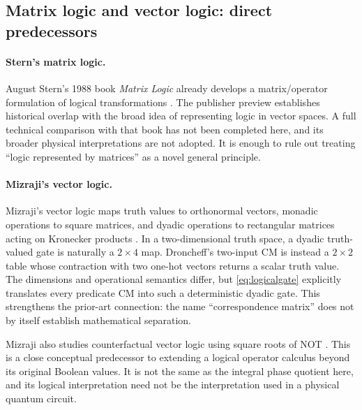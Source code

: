 \subsection{Matrix logic and vector logic: direct predecessors}
\paragraph{Stern's matrix logic.}
August Stern's 1988 book \emph{Matrix Logic} already develops a matrix/operator formulation of logical transformations \cite{stern1988}. The publisher preview establishes historical overlap with the broad idea of representing logic in vector spaces. A full technical comparison with that book has not been completed here, and its broader physical interpretations are not adopted. It is enough to rule out treating ``logic represented by matrices'' as a novel general principle.

\paragraph{Mizraji's vector logic.}
Mizraji's vector logic maps truth values to orthonormal vectors, monadic operations to square matrices, and dyadic operations to rectangular matrices acting on Kronecker products \cite{mizraji2008}. In a two-dimensional truth space, a dyadic truth-valued gate is naturally a $2\times4$ map. Droncheff's two-input CM is instead a $2\times2$ table whose contraction with two one-hot vectors returns a scalar truth value. The dimensions and operational semantics differ, but \cref{eq:logicalgate} explicitly translates every predicate CM into such a deterministic dyadic gate. This strengthens the prior-art connection: the name ``correspondence matrix'' does not by itself establish mathematical separation.

Mizraji also studies counterfactual vector logic using square roots of NOT \cite{mizraji2021}. This is a close conceptual predecessor to extending a logical operator calculus beyond its original Boolean values. It is not the same as the integral phase quotient here, and its logical interpretation need not be the interpretation used in a physical quantum circuit.

